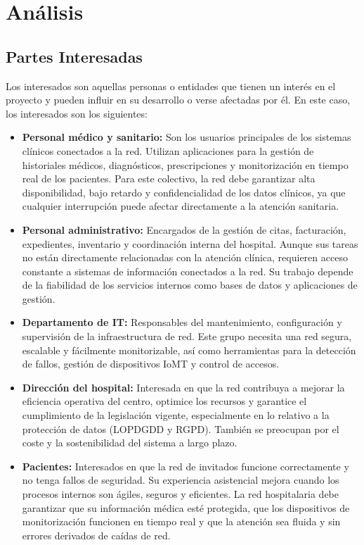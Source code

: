 
\chapter{Análisis }\label{análisis}

\section{Partes Interesadas}
Los interesados son aquellas personas o entidades que tienen un interés en el proyecto y pueden influir en su desarrollo o verse afectadas por él. En este caso, 
los interesados son los siguientes:

\begin{itemize}
    \item \textbf{Personal médico y sanitario:} Son los usuarios principales de los sistemas clínicos conectados a la red. Utilizan aplicaciones para la gestión de 
    historiales médicos, diagnósticos, prescripciones y monitorización en tiempo real de los pacientes. Para este colectivo, la red debe garantizar alta disponibilidad, 
    bajo retardo y confidencialidad de los datos clínicos, ya que cualquier interrupción puede afectar directamente a la atención sanitaria.
    \item \textbf{Personal administrativo:} Encargados de la gestión de citas, facturación, expedientes, inventario y coordinación interna del hospital. Aunque sus tareas 
    no están directamente relacionadas con la atención clínica, requieren acceso constante a sistemas de información conectados a la red. Su trabajo depende de la fiabilidad 
    de los servicios internos como bases de datos y aplicaciones de gestión.
    \item \textbf{Departamento de IT:} Responsables del mantenimiento, configuración y supervisión de la infraestructura de red. Este grupo necesita una red segura, escalable 
    y fácilmente monitorizable, así como herramientas para la detección de fallos, gestión de dispositivos IoMT y control de accesos.
    \item \textbf{Dirección del hospital:} Interesada en que la red contribuya a mejorar la eficiencia operativa del centro, optimice los recursos y garantice el cumplimiento 
    de la legislación vigente, especialmente en lo relativo a la protección de datos (\ac{LOPDGDD} y \ac{RGPD}). También se preocupan por el coste y la sostenibilidad del sistema a 
    largo plazo.
    \item \textbf{Pacientes:} Interesados en que la red de invitados funcione correctamente y no tenga fallos de seguridad. Su experiencia asistencial mejora cuando los 
    procesos internos son ágiles, seguros y eficientes. La red hospitalaria debe garantizar que su información médica esté protegida, que los dispositivos de monitorización 
    funcionen en tiempo real y que la atención sea fluida y sin errores derivados de caídas de red.
\end{itemize}

